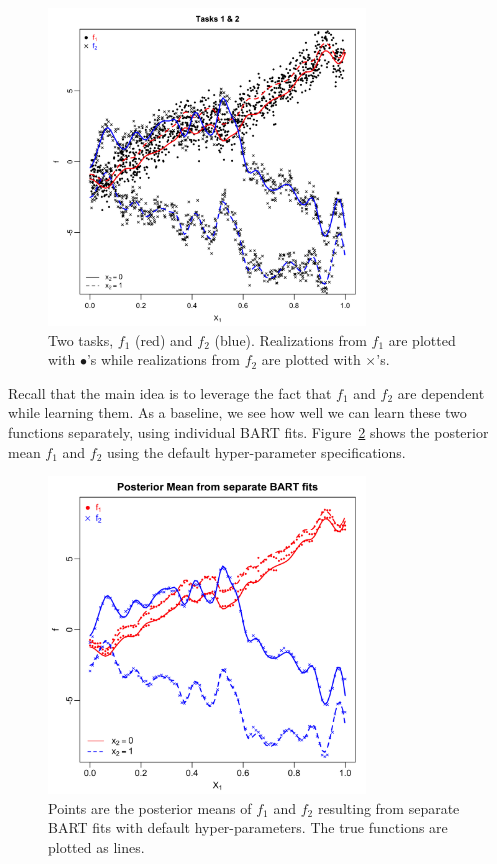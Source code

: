 \documentclass[12pt]{article}
\begin{document}
\begin{figure}[H]
\centering
\includegraphics[width = 0.75\textwidth]{../images/toy_example_data.png}
\caption{Two tasks, $f_{1}$ (red) and $f_{2}$ (blue). Realizations from $f_{1}$ are plotted with $\bullet$'s while realizations from $f_{2}$ are plotted with $\times$'s.}
\label{fig:toy_example_data}
\end{figure}

Recall that the main idea is to leverage the fact that $f_{1}$ and $f_{2}$ are dependent while learning them.
As a baseline, we see how well we can learn these two functions separately, using individual BART fits.
Figure~\ref{fig:toy_example_sepBART_fits} shows the posterior mean $f_{1}$ and $f_{2}$ using the default hyper-parameter specifications.

\begin{figure}[H]
\centering
\includegraphics[width = 0.75\textwidth]{../images/toy_example_sepBART_fits.png}
\caption{Points are the posterior means of $f_{1}$ and $f_{2}$ resulting from separate BART fits with default hyper-parameters. The true functions are plotted as lines.}
\label{fig:toy_example_sepBART_fits}
\end{figure}
\end{document}
